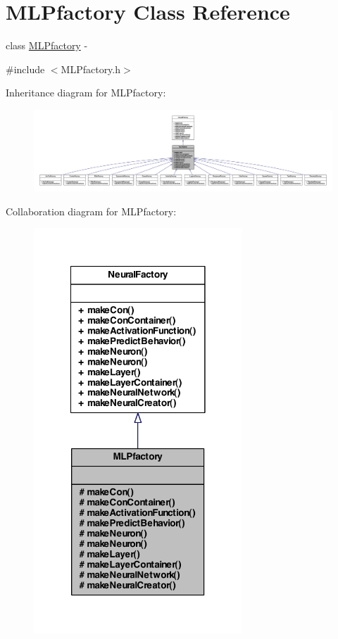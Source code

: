 \hypertarget{class_m_l_pfactory}{
\section{MLPfactory Class Reference}
\label{class_m_l_pfactory}
}


class \hyperlink{class_m_l_pfactory}{MLPfactory} -\/  




{\ttfamily \#include $<$MLPfactory.h$>$}



Inheritance diagram for MLPfactory:\nopagebreak
\begin{figure}[H]
\begin{center}
\leavevmode
\includegraphics[width=400pt]{class_m_l_pfactory__inherit__graph}
\end{center}
\end{figure}


Collaboration diagram for MLPfactory:\nopagebreak
\begin{figure}[H]
\begin{center}
\leavevmode
\includegraphics[width=222pt]{class_m_l_pfactory__coll__graph}
\end{center}
\end{figure}

